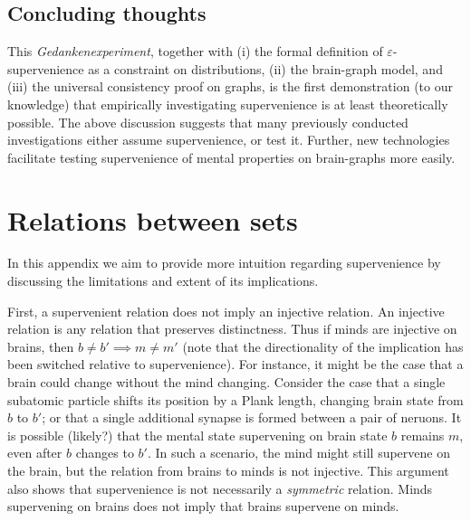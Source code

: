 \documentclass{article}
\begin{document}
\subsection{Concluding thoughts} %
\label{par:concluding_thoughts}


This \emph{Gedankenexperiment}, together with (i) the formal definition of $\varepsilon$-supervenience as a constraint on distributions, (ii) the brain-graph model, and (iii) the universal consistency proof on graphs, is the first demonstration (to our knowledge) that empirically investigating supervenience is at least theoretically possible. The above discussion suggests that many previously conducted investigations either assume supervenience, or test it.  Further, new technologies facilitate testing supervenience of mental properties on brain-graphs more easily.


\clearpage
\appendix



\section{Relations between sets} %
\label{sec:relations}

In this appendix we aim to provide more intuition regarding supervenience by discussing the limitations and extent of its implications. 


First, a supervenient relation does not imply an injective relation.  An injective relation is any relation that preserves distinctness.  Thus if minds are injective on brains, then $b\neq b' \implies m \neq m'$ (note that the directionality of the implication has been switched relative to supervenience). For instance, it might be the case that a brain could change without the mind changing.  Consider the case that a single subatomic particle shifts its position by a Plank length, changing brain state from $b$ to $b'$; or that a single additional synapse is formed between a pair of neruons.  It is possible (likely?) that the mental state supervening on brain state $b$ remains $m$, even after $b$ changes to $b'$.  In such a scenario, the mind might still supervene on the brain, but the relation from brains to minds is not injective. This argument also shows that supervenience is not necessarily a \emph{symmetric} relation.  Minds supervening on brains does not imply that brains supervene on minds.  
\end{document}
